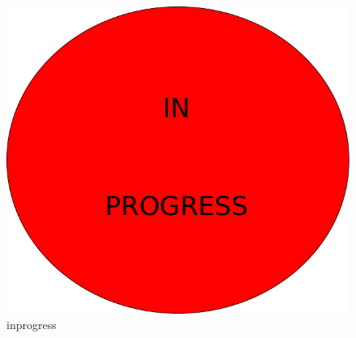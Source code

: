 \begin{figure}
\centering
  \begin{footnotesize}
  \includegraphics[scale=0.25]{images/in-progress.png}
  \caption[inprogress]{inprogress}
  \label{fig:Bild100}
  \end{footnotesize}
\end{figure} 

